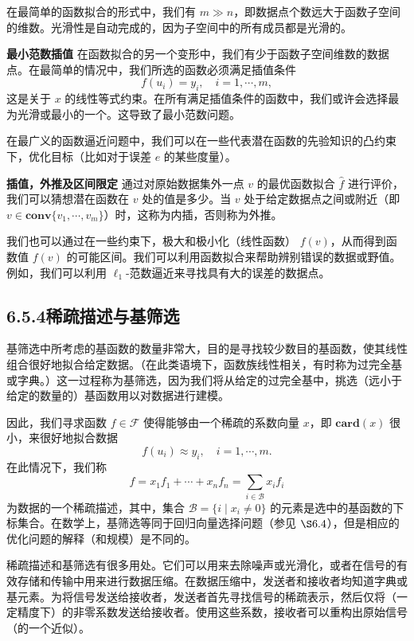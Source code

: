 \documentclass[UTF8,12pt,a4paper,fontset=fandol]{ctexart}
\begin{document}
在最简单的函数拟合的形式中，我们有 $m\gg n$，即数据点个数远大于函数子空间的维数。光滑性是自动完成的，因为子空间中的所有成员都是光滑的。

\noindent\textbf{最小范数插值}\quad
在函数拟合的另一个变形中，我们有少于函数子空间维数的数据点。在最简单的情况中，我们所选的函数必须满足插值条件
\[
f(u_i)=y_i,\quad i=1,\cdots,m,
\]
这是关于 $x$ 的线性等式约束。在所有满足插值条件的函数中，我们或许会选择最为光滑或最小的一个。这导致了最小范数问题。

在最广义的函数逼近问题中，我们可以在一些代表潜在函数的先验知识的凸约束下，优化目标（比如对于误差 $e$ 的某些度量）。

\noindent\textbf{插值，外推及区间限定}\quad
通过对原始数据集外一点 $v$ 的最优函数拟合 $\hat{f}$ 进行评价，我们可以猜想潜在函数在 $v$ 处的值是多少。当 $v$ 处于给定数据点之间或附近（即 $v\in\mathbf{conv}\{v_1,\cdots,v_m\}$）时，这称为内插，否则称为外推。

我们也可以通过在一些约束下，极大和极小化（线性函数） $f(v)$，从而得到函数值 $f(v)$ 的可能区间。我们可以利用函数拟合来帮助辨别错误的数据或野值。例如，我们可以利用 $\ell_1$-范数逼近来寻找具有大的误差的数据点。

\subsection*{6.5.4\quad 稀疏描述与基筛选}

基筛选中所考虑的基函数的数量非常大，目的是寻找较少数目的基函数，使其线性组合很好地拟合给定数据。（在此类语境下，函数族线性相关，有时称为过完全基或字典。）这一过程称为基筛选，因为我们将从给定的过完全基中，挑选（远小于给定的数量的）基函数用以对数据进行建模。

因此，我们寻求函数 $f\in\mathcal{F}$ 使得能够由一个稀疏的系数向量 $x$，即 $\mathbf{card}(x)$ 很小，来很好地拟合数据
\[
f(u_i)\approx y_i,\quad i=1,\cdots,m.
\]
在此情况下，我们称
\[
f=x_1f_1+\cdots+x_nf_n=\sum_{i\in\mathcal{B}}x_if_i
\]
为数据的一个稀疏描述，其中，集合 $\mathcal{B}=\{i\mid x_i\neq 0\}$ 的元素是选中的基函数的下标集合。在数学上，基筛选等同于回归向量选择问题（参见 $\S 6.4$），但是相应的优化问题的解释（和规模）是不同的。

稀疏描述和基筛选有很多用处。它们可以用来去除噪声或光滑化，或者在信号的有效存储和传输中用来进行数据压缩。在数据压缩中，发送者和接收者均知道字典或基元素。为将信号发送给接收者，发送者首先寻找信号的稀疏表示，然后仅将（一定精度下）的非零系数发送给接收者。使用这些系数，接收者可以重构出原始信号（的一个近似）。
\end{document}
